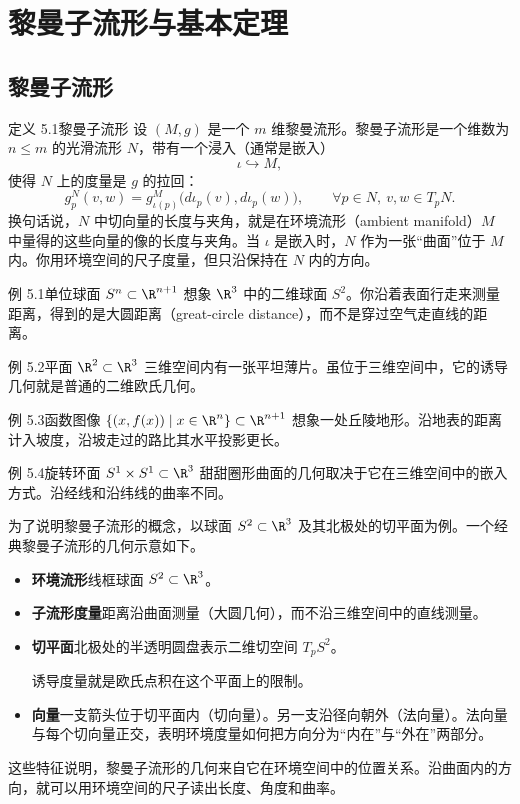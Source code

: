 \section{黎曼子流形与基本定理}
\subsection{黎曼子流形}
\begin{statement}{定义 5.1}{黎曼子流形}
设 $(M,g)$ 是一个 $m$ 维黎曼流形。黎曼子流形是一个维数为 $n\le m$ 的光滑流形 $N$，带有一个浸入（通常是嵌入）
\[
  \iota\hookrightarrow M,
\]
使得 $N$ 上的度量是 $g$ 的拉回：
\[
  g^N_p(v,w)=g^M_{\iota(p)}\bigl(d\iota_p(v),d\iota_p(w)\bigr),
  \qquad \forall p\in N,\ v,w\in T_pN.
\]
换句话说，$N$ 中切向量的长度与夹角，就是在环境流形（ambient manifold）$M$ 中量得的这些向量的像的长度与夹角。当 $\iota$ 是嵌入时，$N$ 作为一张“曲面”位于 $M$ 内。你用环境空间的尺子度量，但只沿保持在 $N$ 内的方向。
\end{statement}

\begin{statement}{例 5.1}{单位球面 $S^n\subset\R^{n+1}$}
想象 $\R^3$ 中的二维球面 $S^2$。你沿着表面行走来测量距离，得到的是大圆距离（great-circle distance），而不是穿过空气走直线的距离。
\end{statement}

\begin{statement}{例 5.2}{平面 $\R^2\subset\R^3$}
三维空间内有一张平坦薄片。虽位于三维空间中，它的诱导几何就是普通的二维欧氏几何。
\end{statement}

\begin{statement}{例 5.3}{函数图像 $\{(x,f(x))\mid x\in\R^n\}\subset\R^{n+1}$}
想象一处丘陵地形。沿地表的距离计入坡度，沿坡走过的路比其水平投影更长。
\end{statement}

\begin{statement}{例 5.4}{旋转环面 $S^1\times S^1\subset\R^3$}
甜甜圈形曲面的几何取决于它在三维空间中的嵌入方式。沿经线和沿纬线的曲率不同。
\end{statement}

为了说明黎曼子流形的概念，以球面 $S^2\subset\R^3$ 及其北极处的切平面为例。一个经典黎曼子流形的几何示意如下。
\begin{itemize}
  \item \textbf{环境流形}\quad 线框球面 $S^2\subset\R^3$。
  \item \textbf{子流形度量}\quad 距离沿曲面测量（大圆几何），而不沿三维空间中的直线测量。
  \item \textbf{切平面}\quad 北极处的半透明圆盘表示二维切空间 $T_p S^2$。

  诱导度量就是欧氏点积在这个平面上的限制。
  \item \textbf{向量}\quad 一支箭头位于切平面内（切向量）。另一支沿径向朝外（法向量）。法向量与每个切向量正交，表明环境度量如何把方向分为“内在”与“外在”两部分。
\end{itemize}
这些特征说明，黎曼子流形的几何来自它在环境空间中的位置关系。沿曲面内的方向，就可以用环境空间的尺子读出长度、角度和曲率。


